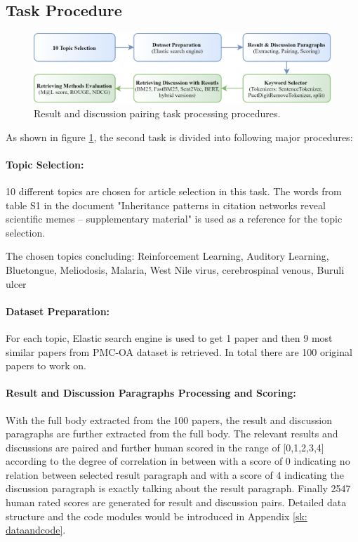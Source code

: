 \documentclass[10pt,a4paper,fleqn]{report}
\begin{document}
	\subsection{Task Procedure}
		
		\begin{figure}[htbp]
			\includegraphics[width=\textwidth]{figure/taskB_procedure.png}
			\caption[]{Result and discussion pairing task processing procedures.}
			\label{fig: taskB_procedure}
		\end{figure}
	
		As shown in figure \ref{fig: taskB_procedure}, the second task is divided into following major procedures:
		
		\paragraph{Topic Selection:}
		
			10 different topics are chosen for article selection in this task. The words from table S1 in the document "Inheritance patterns in citation networks reveal scientific memes – supplementary material" is used as a reference for the topic selection.
			
			The chosen topics concluding: Reinforcement Learning, Auditory Learning, Bluetongue, Meliodosis, Malaria, West Nile virus, cerebrospinal venous, Buruli ulcer
			
		\paragraph{Dataset Preparation:}
		
			For each topic, Elastic search engine is used to get 1 paper and then 9 most similar papers from PMC-OA dataset is retrieved. In total there are 100 original papers to work on.
			
		\paragraph{Result and Discussion Paragraphs Processing and Scoring:}
			
			With the full body extracted from the 100 papers, the result and discussion paragraphs are further extracted from the full body.
			The relevant results and discussions are paired and further human scored in the range of [0,1,2,3,4] according to the degree of correlation in between with a score of 0 indicating no relation between selected result paragraph and with a score of 4 indicating the discussion paragraph is exactly talking about the result paragraph.	
			Finally 2547 human rated scores are generated for result and discussion pairs.
			Detailed data structure and the code modules would be introduced in Appendix \ref{sk: dataandcode}.
		
\end{document}
